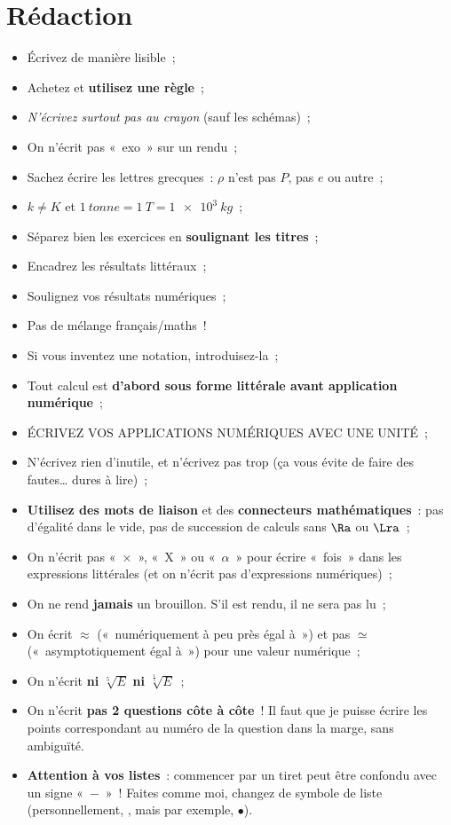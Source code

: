 \documentclass[a4paper, 11pt, final, garamond]{book}
\begin{document}
\section{Rédaction}
\begin{itemize}
	\item Écrivez de manière lisible~;
	\item Achetez et \textbf{utilisez une règle}~;
	\item \textit{N'écrivez surtout pas au crayon} (sauf les schémas)~;
	\item On n'écrit pas «~exo~» sur un rendu~;
	\item Sachez écrire les lettres grecques~: $\rho$ n'est pas $P$, pas $e$ ou
	      autre~;
	\item $k \neq K$ et $\SI{1}{tonne} = \SI{1}{T} = \SI{1e3}{kg}$~;
	\item Séparez bien les exercices en \textbf{soulignant les titres}~;
	\item Encadrez les résultats littéraux~;
	\item Soulignez vos résultats numériques~;
	\item Pas de mélange français/maths~!
	\item Si vous inventez une notation, introduisez-la~;
	\item Tout calcul est \textbf{d'abord sous forme littérale avant application
		      numérique}~;
	\item ÉCRIVEZ VOS APPLICATIONS NUMÉRIQUES AVEC UNE UNITÉ~;
	\item N'écrivez rien d'inutile, et n'écrivez pas trop (ça vous évite de faire
	      des fautes… dures à lire)~;
	\item \textbf{Utilisez des mots de liaison} et des \textbf{connecteurs
		      mathématiques}~: pas d'égalité dans le vide, pas de succession de
	      calculs sans $\Ra$ ou $\Lra$~;
	\item On n'écrit pas «~$\times$~», «~X~» ou «~$\alpha$~» pour écrire «~fois~»
	      dans les expressions littérales (et on n'écrit pas d'expressions
	      numériques)~;
	\item On ne rend \textbf{jamais} un brouillon. S'il est rendu, il ne sera
	      pas lu~;
	\item On écrit $\approx$ («~numériquement à peu près égal à~») et pas $\simeq$
	      («~asymptotiquement égal à~») pour une valeur numérique~;
	\item On n'écrit \textbf{ni} $\sqrt[5]{E}$ \textbf{ni}
	      $\sqrt[\frac{1}{5}]{E}$~;
	\item On n'écrit \textbf{pas 2 questions côte à côte}~! Il faut que je puisse
	      écrire les points correspondant au numéro de la question dans la marge,
	      sans ambiguïté.
	\item \textbf{Attention à vos listes}~: commencer par un tiret peut être
	      confondu avec un signe «~$-$~»~! Faites comme moi, changez de symbole de
	      liste (personnellement, \bdmd, mais par exemple, $\bullet$).
\end{itemize}
\end{document}
